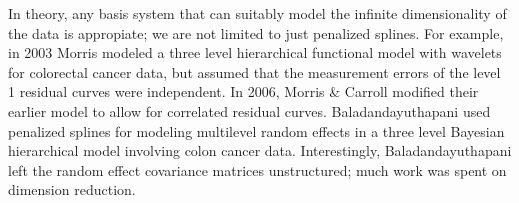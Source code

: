 In theory, any basis system that can suitably model the infinite dimensionality of the data is appropiate; we are not limited to just penalized splines.  
For example, in 2003 Morris modeled a three level hierarchical functional model with wavelets for colorectal cancer data, but assumed that the measurement errors of the level 1 residual curves were independent\cite{morris_wavelet-based_2003}.  
In 2006, Morris \& Carroll modified their earlier model to allow for correlated residual curves\cite{morris_wavelet-based_2006}.  
Baladandayuthapani used penalized splines for modeling multilevel random effects in a three level Bayesian hierarchical model involving colon cancer data\cite{baladandayuthapani_bayesian_2008}.  
Interestingly, Baladandayuthapani left the random effect covariance matrices unstructured; much work was spent on dimension reduction.
